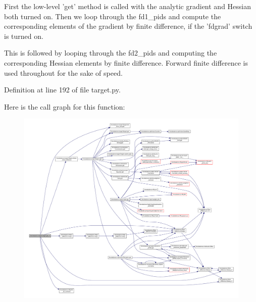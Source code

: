 First the low-\/level 'get' method is called with the analytic gradient and Hessian both turned on. Then we loop through the fd1\-\_\-pids and compute the corresponding elements of the gradient by finite difference, if the 'fdgrad' switch is turned on.

This is followed by looping through the fd2\-\_\-pids and computing the corresponding Hessian elements by finite difference. Forward finite difference is used throughout for the sake of speed. 

Definition at line 192 of file target.\-py.



Here is the call graph for this function\-:\nopagebreak
\begin{figure}[H]
\begin{center}
\leavevmode
\includegraphics[width=350pt]{classforcebalance_1_1target_1_1Target_a1d2ee27fe86a09769c1816af23b09adb_cgraph}
\end{center}
\end{figure}


